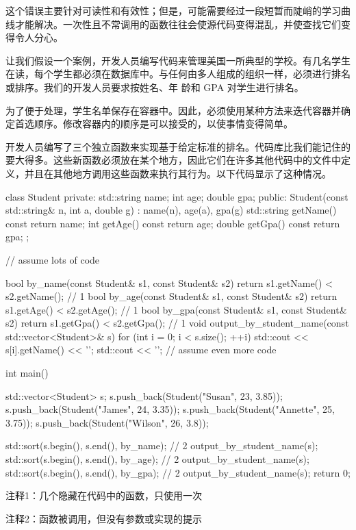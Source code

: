 这个错误主要针对可读性和有效性；但是，可能需要经过一段短暂而陡峭的学习曲线才能解决。一次性且不常调用的函数往往会使源代码变得混乱，并使查找它们变得令人分心。


让我们假设一个案例，开发人员编写代码来管理美国一所典型的学校。有几名学生在读，每个学生都必须在数据库中。与任何由多人组成的组织一样，必须进行排名或排序。我们的开发人员要求按姓名、年 龄和 GPA 对学生进行排名。

为了便于处理，学生名单保存在容器中。因此，必须使用某种方法来迭代容器并确定首选顺序。修改容器内的顺序是可以接受的，以使事情变得简单。

开发人员编写了三个独立函数来实现基于给定标准的排名。代码库比我们能记住的要大得多。这些新函数必须放在某个地方，因此它们在许多其他代码中的文件中定义，并且在其他地方调用这些函数来执行其行为。以下代码显示了这种情况。


\begin{cpp}
class Student {
private:
  std::string name;
  int age;
  double gpa;
public:
  Student(const std::string& n, int a, double g) : name(n), age(a), gpa(g) {}
  std::string getName() const { return name; }
  int getAge() const { return age; }
  double getGpa() const { return gpa; }
};

// assume lots of code

bool by_name(const Student& s1, const Student& s2)
{ return s1.getName() < s2.getName(); } // 1
bool by_age(const Student& s1, const Student& s2)
{ return s1.getAge() < s2.getAge(); } // 1
bool by_gpa(const Student& s1, const Student& s2)
{ return s1.getGpa() < s2.getGpa(); } // 1
void output_by_student_name(const std::vector<Student>& s) {
  for (int i = 0; i < s.size(); ++i)
    std::cout << s[i].getName() << '\n';
  std::cout << '\n';
}
// assume even more code

int main() {
  std::vector<Student> s;
  s.push_back(Student("Susan", 23, 3.85));
  s.push_back(Student("James", 24, 3.35));
  s.push_back(Student("Annette", 25, 3.75));
  s.push_back(Student("Wilson", 26, 3.8));

  std::sort(s.begin(), s.end(), by_name); // 2
  output_by_student_name(s);
  std::sort(s.begin(), s.end(), by_age); // 2
  output_by_student_name(s);
  std::sort(s.begin(), s.end(), by_gpa); // 2
  output_by_student_name(s);
  return 0;
}
\end{cpp}

{\footnotesize
注释1：几个隐藏在代码中的函数，只使用一次

注释2：函数被调用，但没有参数或实现的提示
}

